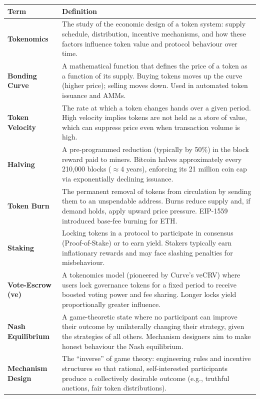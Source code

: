 \documentclass[11pt,a4paper]{article}
\begin{document}
\renewcommand{\arraystretch}{1.25}
\noindent\begin{tabular}{@{}p{3.8cm}p{10.8cm}@{}}
\toprule
\textbf{Term} & \textbf{Definition} \\
\midrule
\textbf{Tokenomics}               & The study of the economic design of a token system: supply schedule, distribution, incentive mechanisms, and how these factors influence token value and protocol behaviour over time. \\
\textbf{Bonding Curve}            & A mathematical function that defines the price of a token as a function of its supply. Buying tokens moves up the curve (higher price); selling moves down. Used in automated token issuance and AMMs. \\
\textbf{Token Velocity}           & The rate at which a token changes hands over a given period. High velocity implies tokens are not held as a store of value, which can suppress price even when transaction volume is high. \\
\textbf{Halving}                  & A pre-programmed reduction (typically by 50\%) in the block reward paid to miners. Bitcoin halves approximately every 210,000 blocks (${\approx}4$ years), enforcing its 21 million coin cap via exponentially declining issuance. \\
\textbf{Token Burn}               & The permanent removal of tokens from circulation by sending them to an unspendable address. Burns reduce supply and, if demand holds, apply upward price pressure. EIP-1559 introduced base-fee burning for ETH. \\
\textbf{Staking}                  & Locking tokens in a protocol to participate in consensus (Proof-of-Stake) or to earn yield. Stakers typically earn inflationary rewards and may face slashing penalties for misbehaviour. \\
\textbf{Vote-Escrow (ve)}         & A tokenomics model (pioneered by Curve's veCRV) where users lock governance tokens for a fixed period to receive boosted voting power and fee sharing. Longer locks yield proportionally greater influence. \\
\textbf{Nash Equilibrium}         & A game-theoretic state where no participant can improve their outcome by unilaterally changing their strategy, given the strategies of all others. Mechanism designers aim to make honest behaviour the Nash equilibrium. \\
\textbf{Mechanism Design}         & The ``inverse'' of game theory: engineering rules and incentive structures so that rational, self-interested participants produce a collectively desirable outcome (e.g., truthful auctions, fair token distributions). \\

\end{tabular}
\end{document}
